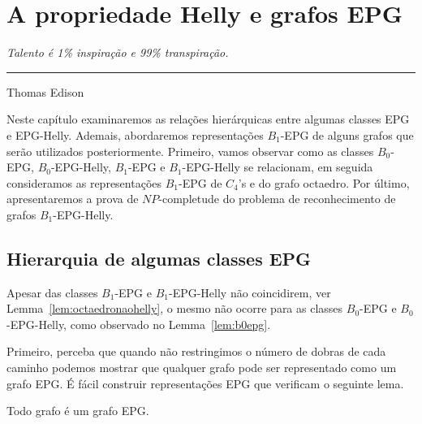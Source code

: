 \chapter{A propriedade Helly e grafos EPG}

\begin{flushright}
\begin{minipage}[t][0cm][b]{0.47\textwidth}
\emph{
Talento é 1\% inspiração e 99\% transpiração. }
\end{minipage}

\rule[0cm]{7cm}{0.03cm}%

Thomas Edison
\end{flushright}

Neste capítulo examinaremos as relações hierárquicas entre algumas classes EPG e EPG-Helly. Ademais, abordaremos representações $B_1$-EPG de alguns grafos que serão utilizados posteriormente. Primeiro, vamos observar como as classes $B_0$-EPG, $B_0$-EPG-Helly, $B_1$-EPG e $B_1$-EPG-Helly se relacionam, em seguida consideramos as representações $B_1$-EPG de $C_4$'s e do grafo octaedro. Por último, apresentaremos a prova de $NP$-completude do problema de reconhecimento de grafos $B_1$-EPG-Helly.


\section{Hierarquia de algumas classes EPG}

Apesar das classes  $B_1$-EPG e $ B_1$-EPG-Helly não coincidirem, ver Lemma~\ref{lem:octaedronaohelly}, o mesmo não ocorre para as classes $ B_0$-EPG e $ B_0$-EPG-Helly, como observado no Lemma~\ref{lem:b0epg}.

Primeiro, perceba que quando não restringimos o número de dobras de cada caminho podemos mostrar que qualquer grafo pode ser representado como um grafo EPG.
É fácil construir representações EPG que verificam o seguinte lema. 

 
 
 \begin{lema} \cite{golumbic2009} \label{lem:todoGrafoEpg}
 Todo grafo é um grafo EPG.
 \end{lema}
 
